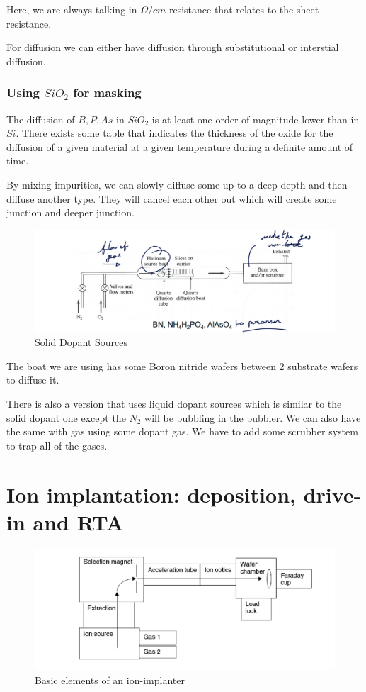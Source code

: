 \documentclass{report}
\begin{document}
Here, we are always talking in $\Omega / cm$ resistance that relates to the sheet resistance.

For diffusion we can either have diffusion through substitutional or interstial diffusion.

\subsubsection{Using $SiO_2$ for masking}

The diffusion of $B,P,As$ in $SiO_2$ is at least one order of magnitude lower than in $Si$. There exists some table that indicates the thickness of the oxide for the diffusion of a given material at a given temperature during a definite amount of time.

By mixing impurities, we can slowly diffuse some up to a deep depth and then diffuse another type. They will cancel each other out which will create some junction and deeper junction.

\begin{figure}[H]
    \centering
    \includegraphics[width=0.75\linewidth]{solid_dopant_sources.png}
    \caption{Solid Dopant Sources}
    \label{fig:SDS-label}
\end{figure}

The boat we are using has some Boron nitride wafers between 2 substrate wafers to diffuse it. 

There is also a version that uses liquid dopant sources which is similar to the solid dopant one except the $N_2$  will be bubbling in the bubbler. We can also have the same with gas using some dopant gas. We have to add some scrubber system to trap all of the gases.

\section{Ion implantation: deposition, drive-in and RTA}

\begin{figure}[H]
    \centering
    \includegraphics[width=0.75\linewidth]{ion_implantation.png}
    \caption{Basic elements of an ion-implanter}
    \label{fig:ion-implanter-label}
\end{figure}
\end{document}
